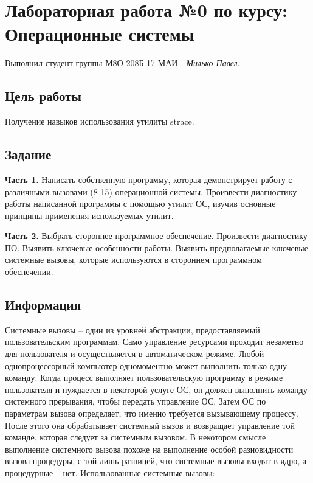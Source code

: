 \documentclass[12pt]{article}
\begin{document}
\section*{\centering Лабораторная работа №0 по курсу:\\ Операционные системы}

\noindent Выполнил студент группы М8О-208Б-17 МАИ \,\, \textit{Милько Павел}.

\subsection*{Цель работы}

Получение навыков использования утилиты strace.



\subsection*{Задание}


{\bf Часть 1.} Написать собственную программу, которая демонстрирует работу с различными вызовами (8-15) операционной системы. Произвести диагностику
работы написанной программы с помощью утилит ОС, изучив основные принципы
применения используемых утилит.

{\bf Часть 2. }Выбрать стороннее программное обеспечение. Произвести диагностику ПО.
Выявить ключевые особенности работы. Выявить предполагаемые ключевые системные вызовы, которые используются в стороннем программном обеспечении.

\subsection*{Информация}

Системные вызовы -- один из уровней абстракции, предоставляемый пользовательским программам. Само управление ресурсами проходит незаметно для пользователя и осуществляется в автоматическом режиме. Любой однопроцессорный компьютер одномоментно может выполнить только одну команду. Когда процесс выполняет
пользовательскую программу в режиме пользователя и нуждается в некоторой
услуге ОС, он должен выполнить команду системного прерывания, чтобы передать
управление ОС. Затем ОС по параметрам вызова определяет, что именно требуется
вызывающему процессу. После этого она обрабатывает системный вызов и возвращает управление той команде, которая следует за системным вызовом. В некотором
смысле выполнение системного вызова похоже на выполнение особой разновидности
вызова процедуры, с той лишь разницей, что системные вызовы входят в ядро, а
процедурные -- нет.
Использованные системные вызовы:
\end{document}
